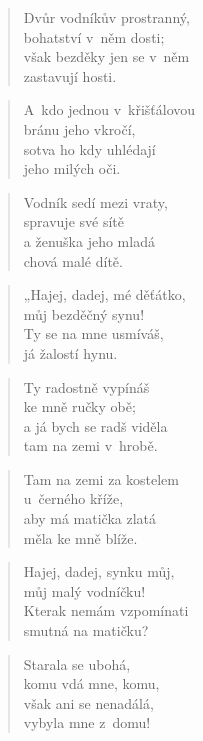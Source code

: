 \begin{verse}
Dvůr vodníkův prostranný, \\
bohatství v~něm dosti; \\
však bezděky jen se v~něm \\
zastavují hosti.
\end{verse}

\begin{verse}
A~kdo jednou v~křišťálovou \\
bránu jeho vkročí, \\
sotva ho kdy uhlédají \\
jeho milých oči.
\end{verse}

\begin{verse}
Vodník sedí mezi vraty, \\
spravuje své sítě \\
a ženuška jeho mladá \\
chová malé dítě.
\end{verse}

\begin{verse}
„Hajej, dadej, mé děťátko, \\
můj bezděčný synu! \\
Ty se na mne usmíváš, \\
já žalostí hynu.
\end{verse}

\begin{verse}
Ty radostně vypínáš \\
ke mně ručky obě; \\
a já bych se radš viděla \\
tam na zemi v~hrobě.
\end{verse}

\begin{verse}
Tam na zemi za kostelem \\
u~černého kříže, \\
aby má matička zlatá \\
měla ke mně blíže.
\end{verse}

\begin{verse}
Hajej, dadej, synku můj, \\
můj malý vodníčku! \\
Kterak nemám vzpomínati \\
smutná na matičku?
\end{verse}

\begin{verse}
Starala se ubohá, \\
komu vdá mne, komu, \\
však ani se nenadálá, \\
vybyla mne z~domu!
\end{verse}

